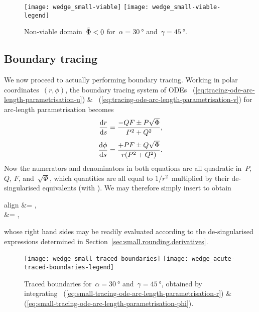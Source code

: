 \begin{figure}
  \newcommand*{\legendoffsetheight}{0.255\textwidth}
  \centering
  \texttt{[image: wedge\_small-viable]}
  \texttt{[image: wedge\_small-viable-legend]}
  \caption{
    Non-viable domain~$\tilde{\Phi} < 0$
    for~$\alpha = \SI{30}{\degree}$ and~$\gamma = \SI{45}{\degree}$.
  }
  \label{fig:wedge_small-viable}
\end{figure}

\subsection{Boundary tracing}
\label{sec:small.rounding.tracing}

We now proceed to actually performing boundary tracing.
Working in polar coordinates~$(r, \phi)$,
the boundary tracing system of ODEs~%
  (\ref{eq:tracing-ode-arc-length-parametrisation-u})
\&~%
  (\ref{eq:tracing-ode-arc-length-parametrisation-v})
for arc-length parametrisation
becomes
\begin{align*}
  \tder{r}{s} &= \frac{-Q F \pm P \sqrt{\Phi}}{P^2 + Q^2},
    \\[\tallspace]
  \tder{\phi}{s} &= \frac{+P F \pm Q \sqrt{\Phi}}{r \roundbr*{P^2 + Q^2}}.
\end{align*}
Now the numerators and denominators in both equations
are all quadratic in~$P$, $Q$, $F$, and~$\sqrt{\Phi}$,
which quantities are all equal to $1 / r^2$~multiplied by
their de-singularised equivalents (with \desingmarks).
We may therefore simply insert \desingmarks{} to obtain
\begin{important}{align}
   &=
    ,
    \label{eq:small-tracing-ode-arc-length-parametrisation-r}
    \\[\tallspace]
   &=
    ,
    \label{eq:small-tracing-ode-arc-length-parametrisation-phi}
\end{important}
whose right hand sides may be readily evaluated
according to the de-singularised expressions determined in
Section~\ref{sec:small.rounding.derivatives}.

\begin{figure}
  \newcommand*{\legendoffsetheight}{0.25\textwidth}
  \centering
  \texttt{[image: wedge\_small-traced-boundaries]}
  \texttt{[image: wedge\_acute-traced-boundaries-legend]}
  \caption{
    Traced boundaries for~$\alpha = \SI{30}{\degree}$
    and~$\gamma = \SI{45}{\degree}$,
    obtained by integrating~%
      (\ref{eq:small-tracing-ode-arc-length-parametrisation-r})
    \&~%
      (\ref{eq:small-tracing-ode-arc-length-parametrisation-phi}).
  }
  \label{fig:wedge_small-traced-boundaries}
\end{figure}

